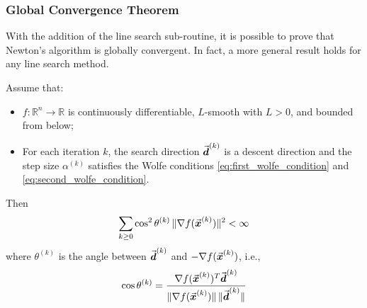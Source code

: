 \subsubsection{Global Convergence Theorem}

With the addition of the line search sub-routine, it is possible to prove that Newton's algorithm is globally convergent. In fact, a more general result holds for any line search method.

\begin{theorem}\label{thm:zoutendijk}
Assume that:
\begin{itemize}
  \item \(f:\mathbb{R}^{n}\to\mathbb{R}\) is continuously differentiable, \(L\)-smooth with \(L>0\), and bounded from below;
  \item For each iteration \(k\), the search direction \(\vec{\boldsymbol{d}}^{(k)}\) is a descent direction and the step size \(\alpha^{(k)}\) satisfies the Wolfe conditions \eqref{eq:first_wolfe_condition} and \eqref{eq:second_wolfe_condition}.
\end{itemize}
Then
\[
\sum_{k \geq 0} \cos^2\theta^{(k)}\, \|\nabla f(\vect{x}^{(k)})\|^2 < \infty %
\]
where \(\theta^{(k)}\) is the angle between \(\vec{\boldsymbol{d}}^{(k)}\) and \(-\nabla f(\vec{\boldsymbol{x}}^{(k)})\), i.e.,
\[
\cos\theta^{(k)} = \frac{\nabla f(\vect{x}^{(k)})^T \vect{d}^{(k)}}{\|\nabla f(\vect{x}^{(k)})\|\,\|\vect{d}^{(k)}\|} %
\]
\end{theorem}

